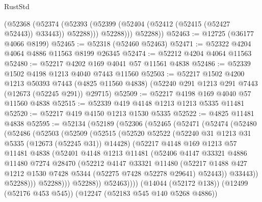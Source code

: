 \begin{lexlean}{RustStd}
\begin{coremodule}
            (@52368
              (@52374 (@52393 (@52399 (@52404 (@52412 (@52415 (@52427 @52443)) @33443)) @52288)))
              @52288)))
        @52288))
@52463 := @12725 (@36177 @4066 @8199)
@52465 := @52318 (@52460 @52463)
@52471 := @52322 @4204 @4064 @4886 @11563 @8199 @26345
@52474 := @52212 @4204 @4064 @11563
@52480 := @52217 @4202 @169 @4041 @57 @11561 @4838
@52486 := @52339 @1502 @4198 @1213 @4040 @7443 @11560
@52503 := @52217
    @1502
    @4200
    @1213
    @50393
    @7443
    (@4825 @11560 @4838)
    (@52240 @291 @1213 @291 @7443 (@12673 (@52245 @291)) @29715)
@52509 := @52217 @4198 @169 @4040 @57 @11560 @4838
@52515 := @52339 @419 @4148 @1213 @1213 @5335 @11481
@52520 := @52217 @419 @4150 @1213 @1530 @5335
@52522 := @4825 @11481 @4838
@52595 := @52134
    (@52189
      (@52306
        (@52465
          (@52471
            (@52474
              (@52480
                (@52486
                  (@52503
                    (@52509
                      (@52515
                        (@52520
                          @52522
                          (@52240 @31 @1213 @31 @5335 (@12673 (@52245 @31)) @14428)
                          (@52217
                            @4148
                            @169
                            @1213
                            @57
                            @11481
                            @4838
                            (@52401
                              @4148
                              @1213
                              @11481
                              (@52406
                                @4147
                                @33321
                                @4886
                                @11480
                                @7274
                                @28470
                                (@52212
                                  @4147
                                  @33321
                                  @11480
                                  (@52217
                                    @1488
                                    @427
                                    @1212
                                    @1530
                                    @7428
                                    @5344
                                    (@52275 @7428 @52278 @29641)
                                    @52443))
                                @33443))
                            @52288)))
                      @52288)))
                @52288))
            @52463))))
    (@14044 (@52172 @138))
    (@12499 (@52176 @453 @545))
    (@12247 (@52183 @545 @140 @5268 @4886))

\end{coremodule}
\end{lexlean}
